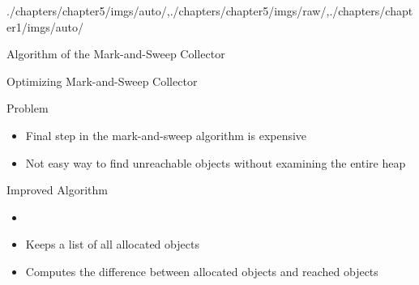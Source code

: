 \begin{graphicspathcontext}{{./chapters/chapter5/imgs/auto/},{./chapters/chapter5/imgs/raw/},{./chapters/chapter1/imgs/auto/}}
\begin{bibunit}[apalike]
\begin{frame}[t]{Algorithm of the Mark-and-Sweep Collector }
	\begin{footnotesize}
		\begin{myalgorithm}
		\end{myalgorithm}
	\end{footnotesize}
\end{frame}

\begin{frame}{Optimizing Mark-and-Sweep Collector}
	\begin{alertblock}{Problem}
		\begin{itemize}
			\item Final step in the mark-and-sweep algorithm is expensive
			\item Not easy way to find unreachable objects without examining the entire heap
		\end{itemize}
	\end{alertblock}
	\vfill
	\begin{block}{Improved Algorithm}
		\begin{itemize}
			\item {}
			\item Keeps a list of all allocated objects
			\item Computes the difference between allocated objects and reached objects
		\end{itemize}
	\end{block}
\end{frame}


\end{bibunit}
\end{graphicspathcontext}
